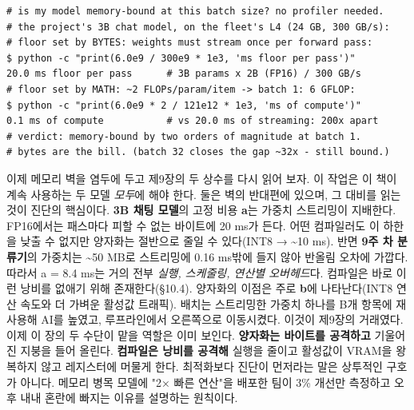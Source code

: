 \begin{terminalbox}
\begin{Verbatim}[breaklines=true,breakanywhere=true,fontsize=\small,formatcom=\color{tbbtermfg},codes=\tbbcodeactive]
# is my model memory-bound at this batch size? no profiler needed.
# the project's 3B chat model, on the fleet's L4 (24 GB, 300 GB/s):
# floor set by BYTES: weights must stream once per forward pass:
$ python -c "print(6.0e9 / 300e9 * 1e3, 'ms floor per pass')"
20.0 ms floor per pass      # 3B params x 2B (FP16) / 300 GB/s
# floor set by MATH: ~2 FLOPs/param/item -> batch 1: 6 GFLOP:
$ python -c "print(6.0e9 * 2 / 121e12 * 1e3, 'ms of compute')"
0.1 ms of compute           # vs 20.0 ms of streaming: 200x apart
# verdict: memory-bound by two orders of magnitude at batch 1.
# bytes are the bill. (batch 32 closes the gap ~32x - still bound.)
\end{Verbatim}
\end{terminalbox}

이제 메모리 벽을 염두에 두고 제9장의 두 상수를 다시 읽어 보자. 이 작업은 이 책이 계속 사용하는 두 모델 \textit{모두}에 해야 한다. 둘은 벽의 반대편에 있으며, 그 대비를 읽는 것이 진단의 핵심이다. \textbf{3B 채팅 모델}의 고정 비용 \textbf{a}는 가중치 스트리밍이 지배한다. FP16에서는 패스마다 피할 수 없는 바이트에 20 ms가 든다. 어떤 컴파일러도 이 하한을 낮출 수 없지만 양자화는 절반으로 줄일 수 있다(INT8 → \textasciitilde{}10 ms). 반면 \textbf{9주 차 분류기}의 가중치는 \textasciitilde{}50 MB로 스트리밍에 0.16 ms밖에 들지 않아 반올림 오차에 가깝다. 따라서 a = 8.4 ms는 거의 전부 \textit{실행, 스케줄링, 연산별 오버헤드}다. 컴파일은 바로 이런 낭비를 없애기 위해 존재한다(§10.4). 양자화의 이점은 주로 \textbf{b}에 나타난다(INT8 연산 속도와 더 가벼운 활성값 트래픽). 배치는 스트리밍한 가중치 하나를 B개 항목에 재사용해 AI를 높였고, 루프라인에서 오른쪽으로 이동시켰다. 이것이 제9장의 거래였다. 이제 이 장의 두 수단이 맡을 역할은 이미 보인다. \textbf{양자화는 바이트를 공격하고} 기울어진 지붕을 들어 올린다. \textbf{컴파일은 낭비를 공격해} 실행을 줄이고 활성값이 VRAM을 왕복하지 않고 레지스터에 머물게 한다. 최적화보다 진단이 먼저라는 말은 상투적인 구호가 아니다. 메모리 병목 모델에 "2× 빠른 연산"을 배포한 팀이 3\% 개선만 측정하고 오후 내내 혼란에 빠지는 이유를 설명하는 원칙이다.

